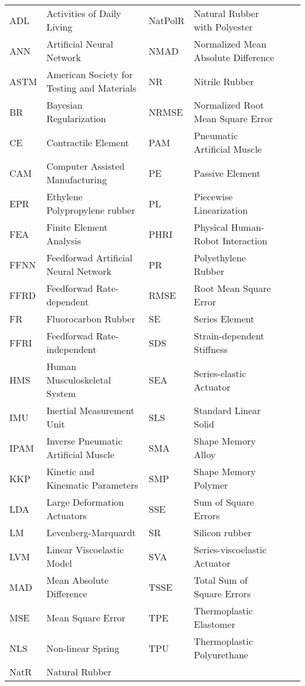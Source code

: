 \begin{abbreviations}


\begin{table}[h]
\centering
\footnotesize{
\begin{tabular}{lp{5cm}lp{5cm}ll}
ADL     & Activities of Daily Living &      NatPolR & Natural Rubber with Polyester \\
ANN     & Artificial Neural Network &      NMAD    & Normalized Mean Absolute Difference  \\
ASTM    & American Society for Testing and Materials &      NR      & Nitrile Rubber  \\
BR      & Bayesian Regularization &       NRMSE   & Normalized Root Mean Square Error  \\
CE      & Contractile Element &     PAM     & Pneumatic Artificial Muscle  \\
CAM     & Computer Assisted Manufacturing &      PE      & Passive Element  \\      
EPR     & Ethylene Polypropylene rubber &      PL      & Piecewise Linearization  \\
FEA     & Finite Element Analysis & PHRI    & Physical Human-Robot Interaction \\      
FFNN    & Feedforwad Artificial Neural Network & PR      & Polyethylene Rubber  \\
FFRD    & Feedforwad Rate-dependent & RMSE    & Root Mean Square Error  \\       
FR      & Fluorocarbon Rubber & SE      & Series Element \\     
FFRI    & Feedforwad Rate-independent & SDS     & Strain-dependent Stiffness \\     
HMS     & Human Musculoskeletal System &     SEA     & Series-elastic Actuator \\    
IMU     & Inertial Measurement Unit &      SLS     & Standard Linear Solid \\
IPAM    & Inverse Pneumatic Artificial Muscle &      SMA     & Shape Memory Alloy  \\
KKP     & Kinetic and Kinematic Parameters &      SMP     & Shape Memory Polymer\\  
LDA     & Large Deformation Actuators &      SSE     & Sum of Square Errors  \\      
LM      & Levenberg-Marquardt &      SR      & Silicon rubber  \\     
LVM     & Linear Viscoelastic Model &      SVA     & Series-viscoelastic Actuator  \\
MAD     & Mean Absolute Difference & TSSE    & Total Sum of Square Errors \\
MSE     & Mean Square Error & TPE     & Thermoplastic Elastomer  \\
NLS     & Non-linear Spring & TPU     & Thermoplastic Polyurethane  \\
NatR    & Natural Rubber \\



\end{tabular}}
\end{table}
\end{abbreviations}
